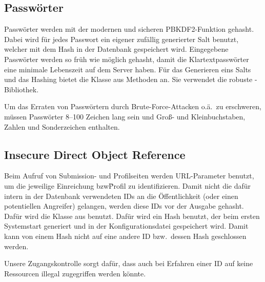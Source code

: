 \subsection{Passwörter}\label{subsec:passwords}
Passwörter werden mit der modernen und sicheren PBKDF2-Funktion gehasht.
Dabei wird für jedes Passwort ein eigener zufällig generierter Salt benutzt, welcher mit dem Hash in der Datenbank gespeichert wird.
Eingegebene Passwörter werden so früh wie möglich gehasht, damit die Klartextpasswörter eine minimale Lebenszeit auf dem Server haben.
Für das Generieren eins Salts und das Hashing bietet die Klasse  aus 
Methoden an.
Sie verwendet die robuste -Bibliothek.

Um das Erraten von Passwörtern durch Brute-Force-Attacken o.ä.\ zu erschweren, müssen Passwörter 8--100 Zeichen lang sein und Groß- und Kleinbuchstaben, Zahlen und Sonderzeichen enthalten.

\subsection{Insecure Direct Object Reference}\label{subsec:idor}
Beim Aufruf von Submission- und Profilseiten werden URL-Parameter benutzt, um die jeweilige Einreichung bzw\. Profil zu identifizieren.
Damit nicht die dafür intern in der Datenbank verwendeten IDs an die Öffentlichkeit (oder einen potentiellen Angreifer) gelangen, werden diese IDs vor der Ausgabe gehasht.
Dafür wird die Klasse  aus  benutzt.
Dafür wird ein Hash benutzt, der beim ersten Systemstart generiert und in der Konfigurationsdatei gespeichert wird.
Damit kann von einem Hash nicht auf eine andere ID bzw.\ dessen Hash geschlossen werden.

Unsere Zugangskontrolle  sorgt dafür, dass auch bei Erfahren einer ID auf keine Ressourcen illegal zugegriffen werden könnte.

